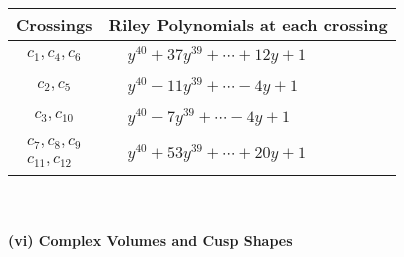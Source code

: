\documentclass[1p]{elsarticle_modified}
\theoremstyle{definition}
\begin{document}
\begin{tabular}{m{50pt}|m{274pt}}
Crossings & \hspace{64pt}Riley Polynomials at each crossing \\
\hline $$\begin{aligned}c_{1},c_{4},c_{6}\end{aligned}$$&$\begin{aligned}
&y^{40}+37 y^{39}+\cdots+12 y+1
\end{aligned}$\\
\hline $$\begin{aligned}c_{2},c_{5}\end{aligned}$$&$\begin{aligned}
&y^{40}-11 y^{39}+\cdots-4 y+1
\end{aligned}$\\
\hline $$\begin{aligned}c_{3},c_{10}\end{aligned}$$&$\begin{aligned}
&y^{40}-7 y^{39}+\cdots-4 y+1
\end{aligned}$\\
\hline $$\begin{aligned}c_{7},c_{8},c_{9}\\c_{11},c_{12}\end{aligned}$$&$\begin{aligned}
&y^{40}+53 y^{39}+\cdots+20 y+1
\end{aligned}$\\
\hline
\end{tabular}\\~\\
\newpage\flushleft \textbf{(vi) Complex Volumes and Cusp Shapes}
\end{document}
